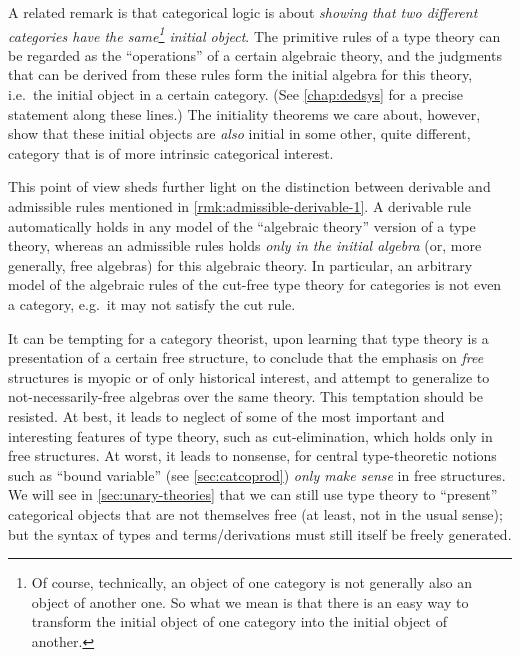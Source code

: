 \label{sec:identifying-initial-objects}
A related remark is that categorical logic is about \emph{showing that two different categories have the same\footnote{Of course, technically, an object of one category is not generally also an object of another one.  So what we mean is that there is an easy way to transform the initial object of one category into the initial object of another.} initial object}.
The primitive rules of a type theory can be regarded as the ``operations'' of a certain algebraic theory, and the judgments that can be derived from these rules form the initial algebra for this theory, i.e.\ the initial object in a certain category.
(See \cref{chap:dedsys} for a precise statement along these lines.)
The initiality theorems we care about, however, show that these initial objects are \emph{also} initial in some other, quite different, category that is of more intrinsic categorical interest.

\begin{rmk}\label{rmk:admissible-derivable-2}\label{rmk:free}
  This point of view sheds further light on the distinction between derivable and admissible rules mentioned in \cref{rmk:admissible-derivable-1}.
  A derivable rule automatically holds in any model of the ``algebraic theory'' version of a type theory, whereas an admissible rules holds \emph{only in the initial algebra} (or, more generally, free algebras) for this algebraic theory.
  In particular, an arbitrary model of the algebraic rules of the cut-free type theory for categories is not even a category, e.g.\ it may not satisfy the cut rule.

  It can be tempting for a category theorist, upon learning that type theory is a presentation of a certain free structure, to conclude that the emphasis on \emph{free} structures is myopic or of only historical interest, and attempt to generalize to not-necessarily-free algebras over the same theory.
  This temptation should be resisted.
  At best, it leads to neglect of some of the most important and interesting features of type theory, such as cut-elimination, which holds only in free structures.
  At worst, it leads to nonsense, for central type-theoretic notions such as ``bound variable'' (see \cref{sec:catcoprod}) \emph{only make sense} in free structures.
  We will see in \cref{sec:unary-theories} that we can still use type theory to ``present'' categorical objects that are not themselves free (at least, not in the usual sense); but the syntax of types and terms/derivations must still itself be freely generated.
\end{rmk}


